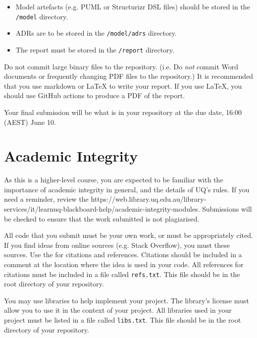 \documentclass{csse4400}
\begin{document}
\begin{itemize}
    \item Model artefacts (e.g. PUML or Structurizr DSL files) should be stored in the \texttt{/model} directory.
    \item ADRs are to be stored in the \texttt{/model/adrs} directory.
    \item The report must be stored in the \texttt{/report} directory.
\end{itemize}

Do not commit large binary files to the repository.
(i.e. Do \emph{not} commit Word documents or frequently changing PDF files to the repository.)
It is recommended that you use markdown or LaTeX to write your report.
If you use LaTeX, you should use GitHub actions to produce a PDF of the report.

Your final submission will be what is in your repository at the due date, 16:00 (AEST) June 10.


\section{Academic Integrity}
As this is a higher-level course, you are expected to be familiar with the importance of academic integrity in general, and the details of UQ's rules.
If you need a reminder, review the 
{https://web.library.uq.edu.au/library-services/it/learnuq-blackboard-help/academic-integrity-modules}.
Submissions will be checked to ensure that the work submitted is not plagiarised.

All code that you submit must be your own work, or must be appropriately cited.
If you find ideas from online sources (e.g. Stack Overflow), you must  these sources.
Use the  for citations and references.
Citations should be included in a comment at the location where the idea is used in your code.
All references for citations must be included in a file called \texttt{refs.txt}.
This file should be in the root directory of your repository.

You may use libraries to help implement your project.
The library's license must allow you to use it in the context of your project.
All libraries used in your project must be listed in a file called \texttt{libs.txt}.
This file should be in the root directory of your repository.
\end{document}
